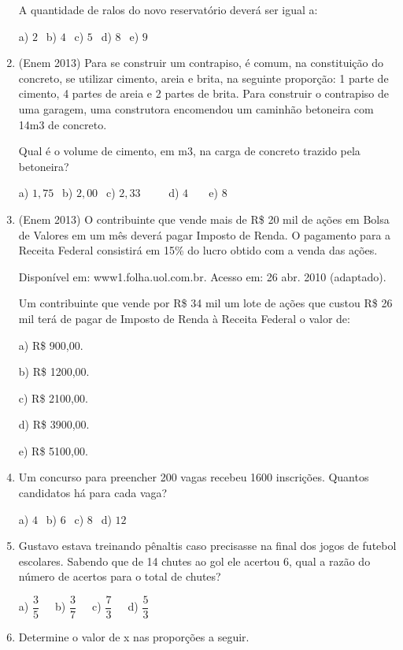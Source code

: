 \begin{multicols*}{2}
\begin{enumerate}
A quantidade de ralos do novo reservatório deverá ser igual a:

		a) $2 \ \ $ b) $4 \ \ $ c) $5 \ \ $ d) $8 \ \ $ e) $9 \ \ $
		
			\item (Enem 2013) Para se construir um contrapiso, é comum, na constituição do concreto, se utilizar cimento, areia e brita, na seguinte proporção: 1 parte de cimento, 4 partes de areia e 2 partes de brita. Para construir o contrapiso de uma
garagem, uma construtora encomendou um caminhão betoneira com 14m3 de concreto.

Qual é o volume de cimento, em m3, na carga de concreto trazido pela betoneira?

		a) $1,75 \ \ $ b) $2,00 \ \ $ c) $2,33 \ \ \ \ \ \ \ \ \ \ $ d) $4 \ \ \ \ \ \ \ $ e) $8 \ \ $
			
			\item (Enem 2013) O contribuinte que vende mais de R\$ 20 mil de ações em Bolsa de Valores em um mês deverá pagar Imposto de Renda. O pagamento para a Receita Federal consistirá em 15\% do lucro obtido com a venda das ações.
			
Disponível em: www1.folha.uol.com.br. Acesso em: 26
abr. 2010 (adaptado).

Um contribuinte que vende por R\$ 34 mil um lote de ações que custou R\$ 26 mil terá de pagar de Imposto de Renda à
Receita Federal o valor de:

a) R\$ 900,00.

b) R\$ 1200,00.

c) R\$ 2100,00.

d) R\$ 3900,00.

e) R\$ 5100,00.\\

			\item Um concurso para preencher 200 vagas recebeu 1600 inscrições. Quantos candidatos há para cada vaga?

		a) $4 \ \ $ b) $6 \ \ $ c) $8 \ \ $ d) $12 \ \ $

			\item Gustavo estava treinando pênaltis caso precisasse na final dos jogos de futebol escolares. Sabendo que de 14 chutes ao gol ele acertou 6, qual a razão do número de acertos para o total de chutes?

		a) $\dfrac{3}{5} \ \ \ \ \ $ b) $\dfrac{3}{7} \ \ \ \ \ $ c) $\dfrac{7}{3} \ \ \ \ \ $ d) $\dfrac{5}{3} $

			\item Determine o valor de x nas proporções a seguir.


\end{enumerate}
\end{multicols*}
